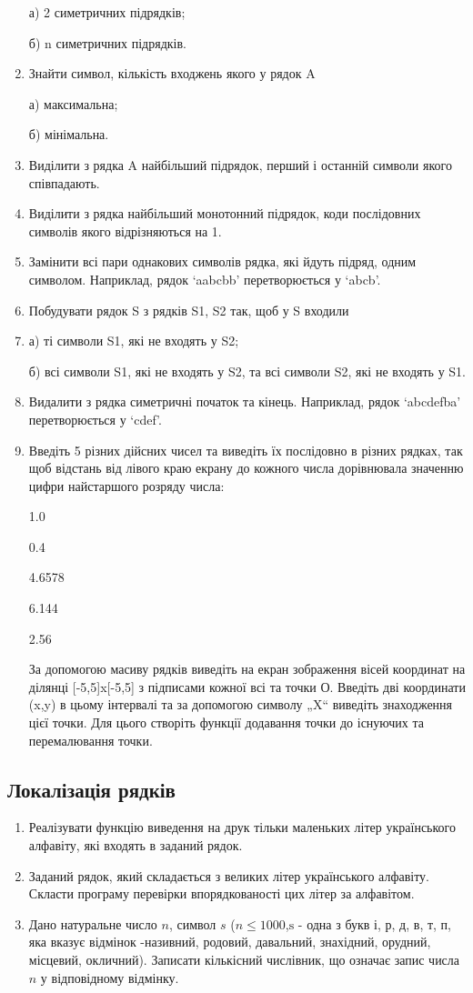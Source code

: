 \documentclass[]{article}
\begin{document}
\begin{enumerate}
а) 2 симетричних підрядків;

б) n симетричних підрядків.
\item
Знайти символ, кількість входжень якого у рядок A

а) максимальна;

б) мінімальна.
\item
Виділити з рядка A найбільший підрядок, перший і останній символи якого
співпадають.
\item
Виділити з рядка найбільший монотонний підрядок, коди послідовних
символів якого відрізняються на 1.
\item
Замінити всі пари однакових символів рядка, які йдуть підряд, одним
символом. Наприклад, рядок `aabcbb' перетворюється у `abcb'.
\item
Побудувати рядок S з рядків S1, S2 так, щоб у S входили
\item
а) ті символи S1, які не входять у S2;

б) всі символи S1, які не входять у S2, та всі символи S2, які не
входять у S1.
\item
Видалити з рядка симетричні початок та кінець. Наприклад, рядок
`abcdefba' перетворюється у `cdef'.

\item
Введіть 5 різних дійсних чисел та виведіть їх послідовно в різних
рядках, так щоб відстань від лівого краю екрану до кожного числа
дорівнювала значенню цифри найстаршого розряду числа:

1.0

0.4

4.6578

6.144

2.56

За допомогою масиву рядків виведіть на екран зображення вісей координат
на ділянці {[}-5,5{]}x{[}-5,5{]} з підписами кожної всі та точки О.
Введіть дві координати (x,y) в цьому інтервалі та за допомогою символу
„X`` виведіть знаходження цієї точки. Для цього створіть функції
додавання точки до існуючих та перемалювання точки.
\end{enumerate}

\subsection{ Локалізація рядків}
\begin{enumerate}
\item
Реалізувати функцію виведення на друк тільки маленьких літер
українського алфавіту, які входять в заданий рядок.
\item
Заданий рядок, який складається з великих літер українського алфавіту.
Скласти програму перевірки впорядкованості цих літер за алфавітом.
\item
Дано натуральне число \(n\), символ \(s\)
(\(n \leq 1000\),\(\text{s\ }\)- одна з букв і, р, д, в, т, п, яка
вказує відмінок -називний, родовий, давальний, знахідний, орудний,
місцевий, окличний). Записати кількісний числівник, що означає запис
числа \(n\) у відповідному відмінку.

\end{enumerate}
\end{document}
